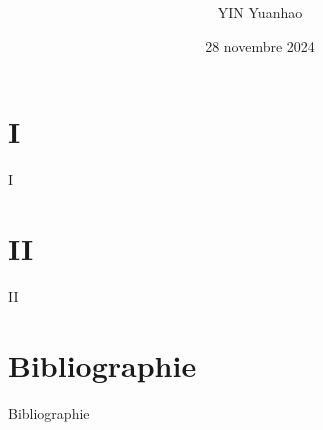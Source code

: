 \documentclass[hyperref={colorlinks=true, linkcolor=blue, anchorcolor=blue, citecolor=blue, urlcolor=red}]{beamer}
\title[]{\textbf{}}%
\author[]{YIN Yuanhao}%
\institute[]{CNRS-CRLAO-INALCO}%
\date[]
{28 novembre 2024}%
\begin{document}
\frame{\titlepage}

\section{\textbf{I}}
\begin{frame}{I}
    
\end{frame}

\section{\textbf{II}}
\begin{frame}{II}

\end{frame}

\section*{\textbf{Bibliographie}}
\begin{frame}[allowframebreaks]{Bibliographie}
    \printbibliography
\end{frame}
\end{document}
